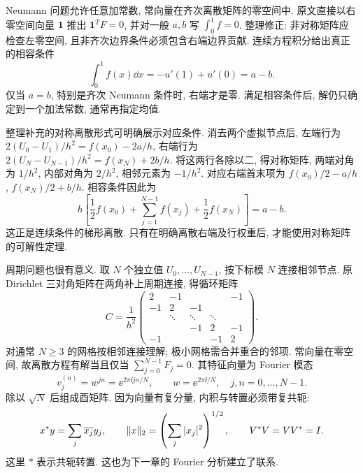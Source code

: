 Neumann 问题允许任意加常数, 常向量在齐次离散矩阵的零空间中. 原文直接以右零空间向量 $\boldsymbol1$ 推出 $\boldsymbol1^TF=0$, 并对一般 $a,b$ 写 $\int_0^1f=0$. 整理修正: 非对称矩阵应检查左零空间, 且非齐次边界条件必须包含右端边界贡献. 连续方程积分给出真正的相容条件
\[
\int_0^1f(x)\dd x=-u'(1)+u'(0)=a-b.
\]
仅当 $a=b$, 特别是齐次 Neumann 条件时, 右端才是零. 满足相容条件后, 解仍只确定到一个加法常数, 通常再指定均值.

整理补充的对称离散形式可明确展示对应条件. 消去两个虚拟节点后, 左端行为 $2(U_0-U_1)/h^2=f(x_0)-2a/h$, 右端行为 $2(U_N-U_{N-1})/h^2=f(x_N)+2b/h$. 将这两行各除以二, 得对称矩阵, 两端对角为 $1/h^2$, 内部对角为 $2/h^2$, 相邻元素为 $-1/h^2$. 对应右端首末项为 $f(x_0)/2-a/h$, $f(x_N)/2+b/h$. 相容条件因此为
\[
h\left[\frac12f(x_0)+\sum_{j=1}^{N-1}f(x_j)+\frac12f(x_N)\right]=a-b.
\]
这正是连续条件的梯形离散. 只有在明确离散右端及行权重后, 才能使用对称矩阵的可解性定理.

周期问题也很有意义. 取 $N$ 个独立值 $U_0,\ldots,U_{N-1}$, 按下标模 $N$ 连接相邻节点. 原 Dirichlet 三对角矩阵在两角补上周期连接, 得循环矩阵
\[
C=\frac1{h^2}\begin{pmatrix}
2&-1&&&-1\\-1&2&-1&&\\&\ddots&\ddots&\ddots&\\&&-1&2&-1\\-1&&&-1&2
\end{pmatrix}.
\]
对通常 $N\geq3$ 的网格按相邻连接理解; 极小网格需合并重合的邻项. 常向量在零空间, 故离散方程有解当且仅当 $\sum_{j=0}^{N-1}F_j=0$. 其特征向量为 Fourier 模态
\[
v_j^{(n)}=w^{jn}=\ee^{2\pi\ii jn/N},\qquad
w=\ee^{2\pi\ii/N},\quad j,n=0,\ldots,N-1.
\]
除以 $\sqrt N$ 后组成酉矩阵. 因为向量有复分量, 内积与转置必须带复共轭:
\[
x^*y=\sum_j\overline{x_j}y_j,\qquad
\lVert x\rVert_2=\left(\sum_j|x_j|^2\right)^{1/2},\qquad V^*V=VV^*=I.
\]
这里 $*$ 表示共轭转置. 这也为下一章的 Fourier 分析建立了联系.
